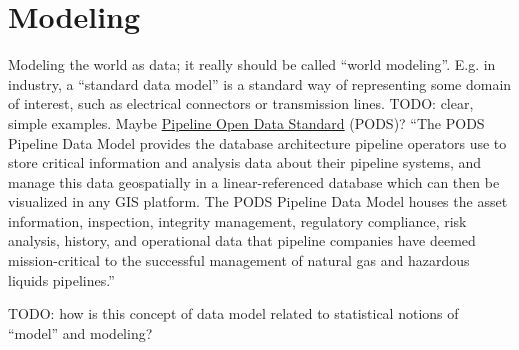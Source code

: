 \part{Modeling}

\begin{ednote}
  Modeling the world as data; it really should be called ``world
  modeling''.  E.g. in industry, a ``standard data model'' is a
  standard way of representing some domain of interest, such as
  electrical connectors or transmission lines.  TODO: clear, simple
  examples.  Maybe \href{http://www.pods.org/4/The PODS Data
    Model/}{Pipeline Open Data Standard} (PODS)?  ``The PODS Pipeline Data Model provides the database architecture pipeline operators use to store critical information and analysis data about their pipeline systems, and manage this data geospatially in a linear-referenced database which can then be visualized in any GIS platform.  The PODS Pipeline Data Model houses the asset information, inspection, integrity management, regulatory compliance, risk analysis, history, and operational data that pipeline companies have deemed mission-critical to the successful management of natural gas and hazardous liquids pipelines.''

  TODO: how is this concept of data model related to statistical
  notions of ``model'' and modeling?
\end{ednote}


